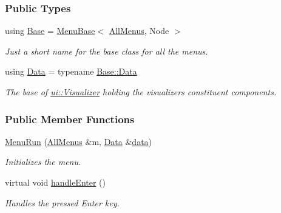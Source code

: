 \subsubsection*{Public Types}
\begin{DoxyCompactItemize}
\item 
using \hyperlink{structslb_1_1core_1_1ui_1_1MenuRun_ae707c5a027ee1bc882ad4f9c214fdca4}{Base} = \hyperlink{structslb_1_1core_1_1ui_1_1MenuBase}{Menu\+Base}$<$ \hyperlink{structslb_1_1core_1_1ui_1_1AllMenus}{All\+Menus}, Node $>$\hypertarget{structslb_1_1core_1_1ui_1_1MenuRun_ae707c5a027ee1bc882ad4f9c214fdca4}{}\label{structslb_1_1core_1_1ui_1_1MenuRun_ae707c5a027ee1bc882ad4f9c214fdca4}

\begin{DoxyCompactList}\small\item\em Just a short name for the base class for all the menus. \end{DoxyCompactList}\item 
using \hyperlink{structslb_1_1core_1_1ui_1_1MenuRun_aae47458c69c2ad7b8d88d1cedb5b5af6}{Data} = typename \hyperlink{structslb_1_1core_1_1ui_1_1MenuBase_a1803444111552d2e5b87671292dd74cb}{Base\+::\+Data}\hypertarget{structslb_1_1core_1_1ui_1_1MenuRun_aae47458c69c2ad7b8d88d1cedb5b5af6}{}\label{structslb_1_1core_1_1ui_1_1MenuRun_aae47458c69c2ad7b8d88d1cedb5b5af6}

\begin{DoxyCompactList}\small\item\em The base of \hyperlink{structslb_1_1core_1_1ui_1_1Visualizer}{ui\+::\+Visualizer} holding the visualizer\textquotesingle{}s constituent components. \end{DoxyCompactList}\end{DoxyCompactItemize}
\subsubsection*{Public Member Functions}
\begin{DoxyCompactItemize}
\item 
\hyperlink{structslb_1_1core_1_1ui_1_1MenuRun_ae89f02f9e1f4eef1daf66bd7f8872274}{Menu\+Run} (\hyperlink{structslb_1_1core_1_1ui_1_1AllMenus}{All\+Menus} \&m, \hyperlink{structslb_1_1core_1_1ui_1_1MenuBase_a1803444111552d2e5b87671292dd74cb}{Data} \&\hyperlink{structslb_1_1core_1_1ui_1_1MenuBase_a475d9457affb2b4fc96737e269d6911f}{data})
\begin{DoxyCompactList}\small\item\em Initializes the menu. \end{DoxyCompactList}\item 
virtual void \hyperlink{structslb_1_1core_1_1ui_1_1MenuRun_aaa5f87dff9512cf13f8f7fe4d67c6971}{handle\+Enter} ()\hypertarget{structslb_1_1core_1_1ui_1_1MenuRun_aaa5f87dff9512cf13f8f7fe4d67c6971}{}\label{structslb_1_1core_1_1ui_1_1MenuRun_aaa5f87dff9512cf13f8f7fe4d67c6971}

\begin{DoxyCompactList}\small\item\em Handles the pressed Enter key. \end{DoxyCompactList}\end{DoxyCompactItemize}
